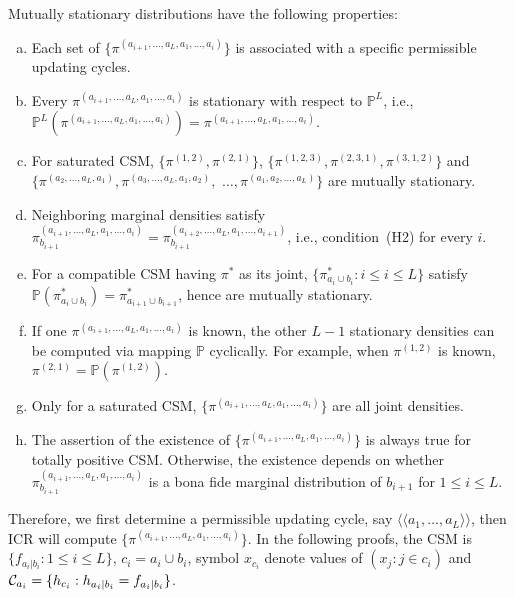\documentclass[12pt,a4paper]{article}
\begin{document}
Mutually stationary distributions have the following properties:
\begin{enumerate}[(a)]
\item Each set of $\{\pi^{(a_{i+1},\ldots,a_L,a_1,\ldots,a_i)}\}$ is
associated with a specific permissible updating cycles.
\item Every $\pi^{(a_{i+1},\ldots,a_L,a_1,\ldots,a_i)}$ is stationary with
 respect to ${\mathbb P}^{L}$, i.e.,
${\mathbb P}^{L}(\pi^{(a_{i+1},\ldots,a_L,a_1,\ldots,a_i)})=\pi^{(a_{i+1},\ldots,a_L,a_1,\ldots,a_i)}$.
\item For saturated CSM, $\{\pi^{(1,2)},\pi^{(2,1)}\}$,
$\{\pi^{(1,2,3)},\pi^{(2,3,1)},\pi^{(3,1,2)}\}$ and
$\{\pi^{(a_2,\ldots,a_L,a_1)}, \pi^{(a_3,\ldots,a_L,a_1,a_2)},$
$\ldots, \pi^{(a_1,a_2,\ldots,a_L)}\}$
are mutually stationary.
\item Neighboring marginal densities satisfy
$\pi^{(a_{i+1},\ldots,a_L,a_1,\ldots,a_i)}_{b_{i+1}} = \pi^{(a_{i+2},\ldots,a_L,a_1,\ldots,a_{i+1})}_{b_{i+1}}$, i.e., condition~(H2) for every $i$.
\item For a compatible CSM having $\pi^*$ as its joint,
$\{\pi^*_{a_i \cup b_i}: i\le i \le L \}$ satisfy
${\mathbb P} (\pi^*_{a_i \cup b_i})= \pi^*_{a_{i+1} \cup b_{i+1}}$,
hence are mutually stationary.
\item If one $\pi^{(a_{i+1},\ldots,a_L,a_1,\ldots,a_i)}$ is known, the other $L-1$ stationary densities
can be computed via mapping ${\mathbb P}$ cyclically.
For example, when $\pi^{(1,2)}$ is known, $\pi^{(2,1)}= {\mathbb P}(\pi^{(1,2)})$.
\item Only for a saturated CSM, $\{\pi^{(a_{i+1},\ldots,a_L,a_1,\ldots,a_i)}\}$
are all joint densities.
\item The assertion of the existence of
$\{\pi^{(a_{i+1},\ldots,a_L,a_1,\ldots,a_i)}\}$ is always true for
totally positive CSM. Otherwise, the existence depends on whether
$\pi^{(a_{i+1},\ldots,a_L,a_1,\ldots,a_i)}_{b_{i+1}}$ is a bona fide marginal distribution of
$b_{i+1}$ for $1\le i \le L$.
\end{enumerate}
Therefore, we first determine a permissible updating cycle,
say $\langle \langle a_1,\ldots,a_L\rangle \rangle$, then ICR will compute
$\{\pi^{(a_{i+1},\ldots,a_L,a_1,\ldots,a_i)}\}$.
In the following proofs, the CSM is $\{f_{a_i|b_i}:1\leq i\leq L\}$,
$c_i=a_i\cup b_i$, symbol $x_{c_i}$ denote values of $(x_j: j \in c_i)$
and ${\cal C}_{a_i}=\{h_{c_i}:h_{a_i|b_i}=f_{a_i|b_i}\}$.
\end{document}
